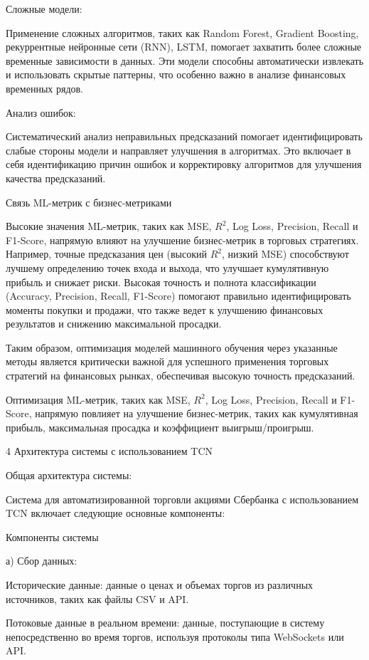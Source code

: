 Сложные модели:

Применение сложных алгоритмов, таких как Random Forest, Gradient Boosting, рекуррентные нейронные сети (RNN), LSTM, помогает захватить более сложные временные зависимости в данных. Эти модели способны автоматически извлекать и использовать скрытые паттерны, что особенно важно в анализе финансовых временных рядов.

Анализ ошибок:

Систематический анализ неправильных предсказаний помогает идентифицировать слабые стороны модели и направляет улучшения в алгоритмах. Это включает в себя идентификацию причин ошибок и корректировку алгоритмов для улучшения качества предсказаний.

Связь ML-метрик с бизнес-метриками

Высокие значения ML-метрик, таких как MSE, $R^2$, Log Loss, Precision, Recall и F1-Score, напрямую влияют на улучшение бизнес-метрик в торговых стратегиях. Например, точные предсказания цен (высокий $R^2$, низкий MSE) способствуют лучшему определению точек входа и выхода, что улучшает кумулятивную прибыль и снижает риски. Высокая точность и полнота классификации (Accuracy, Precision, Recall, F1-Score) помогают правильно идентифицировать моменты покупки и продажи, что также ведет к улучшению финансовых результатов и снижению максимальной просадки.


Таким образом, оптимизация моделей машинного обучения через указанные методы является критически важной для успешного применения торговых стратегий на финансовых рынках, обеспечивая высокую точность предсказаний.

Оптимизация ML-метрик, таких как MSE, $R^2$, Log Loss, Precision, Recall и F1-Score, напрямую повлияет на улучшение бизнес-метрик, таких как кумулятивная прибыль, максимальная просадка и коэффициент выигрыш/проигрыш.

\newpage
{}
4 Архитектура системы с использованием TCN

Общая архитектура системы:

Система для автоматизированной торговли акциями Сбербанка с использованием TCN включает следующие основные компоненты:

Компоненты системы

а) Сбор данных:

Исторические данные: данные о ценах и объемах торгов из различных источников, таких как файлы CSV и API.

Потоковые данные в реальном времени: данные, поступающие в систему непосредственно во время торгов, используя протоколы типа WebSockets или API.


